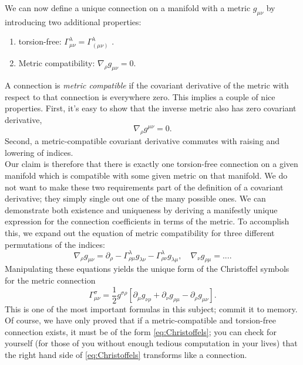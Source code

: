We can now define a unique connection on a manifold with a metric $g_{μν}$ by introducing
two additional properties:
\begin{enumerate}
\item  torsion-free: $Γ^λ_{μν} = Γ^λ_{ (μν)}$ .
\item Metric compatibility: $\nabla_\rho g_{\mu \nu} =0.$
\end{enumerate}
A connection is \emph{metric compatible} if the covariant derivative of the metric with respect to
that connection is everywhere zero. This implies a couple of nice properties. First, it’s easy
to show that the inverse metric also has zero covariant derivative,
\begin{equation}
	\nabla_\rho g^{\mu \nu} = 0.
\end{equation}
Second, a metric-compatible covariant derivative commutes with raising and lowering of
indices.\\
Our claim is therefore that there is exactly one torsion-free connection on a given manifold
which is compatible with some given metric on that manifold. We do not want to make these
two requirements part of the definition of a covariant derivative; they simply single out one
of the many possible ones. We can demonstrate both existence and uniqueness by deriving a manifestly unique
expression for the connection coefficients in terms of the metric. To accomplish this, we
expand out the equation of metric compatibility for three different permutations of the
indices:
\begin{equation}
	\nabla_\rho g_{\mu \nu} = \partial_\rho - \Gamma^\lambda_{\rho \mu} g_{\lambda \nu} - \Gamma^\lambda_{\rho \nu} g_{\lambda \mu}, \quad \nabla_\nu g_{\rho \mu} = ....
\end{equation}
Manipulating these equations yields the unique form of the Christoffel symbols for the metric connection
\begin{equation}
\label{eq:Christoffels}
	\Gamma^\sigma_{\mu \nu} = \frac{1}{2} g^{\sigma \rho} \left[\partial_{\mu} g_{\nu \rho} + \partial_\nu g_{\rho \mu} - \partial_\rho g_{\mu \nu} \right].
\end{equation}
This is one of the most important formulas in this subject; commit it to memory. Of course,
we have only proved that if a metric-compatible and torsion-free connection exists, it must
be of the form \ref{eq:Christoffels}; you can check for yourself (for those of you without enough tedious
computation in your lives) that the right hand side of \ref{eq:Christoffels} transforms like a connection.
